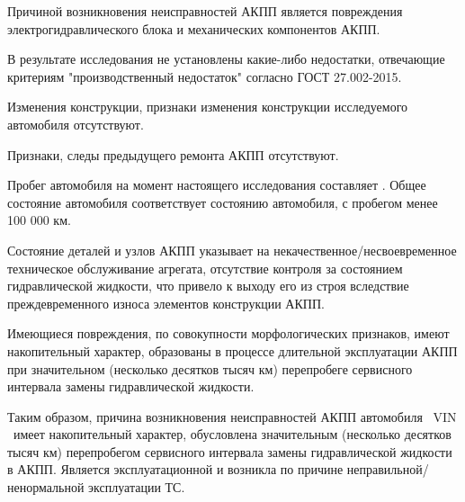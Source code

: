 
Причиной возникновения неисправностей АКПП является  повреждения электрогидравлического блока и механических компонентов АКПП.



В результате исследования не установлены какие-либо недостатки, отвечающие критериям "производственный недостаток" согласно ГОСТ 27.002-2015.

Изменения конструкции, признаки изменения конструкции исследуемого автомобиля отсутствуют.

Признаки, следы предыдущего ремонта АКПП отсутствуют.

Пробег автомобиля на момент настоящего исследования составляет . Общее состояние автомобиля соответствует состоянию автомобиля, с пробегом менее 100 000 км.

Состояние  деталей и узлов АКПП указывает на некачественное/несвоевременное техническое обслуживание агрегата, отсутствие контроля за состоянием гидравлической жидкости, что привело к выходу его из строя вследствие  преждевременного износа элементов конструкции АКПП.

 Имеющиеся повреждения, по совокупности морфологических признаков, имеют накопительный характер, образованы в процессе длительной эксплуатации АКПП при значительном  (несколько десятков тысяч км) перепробеге сервисного интервала замены гидравлической жидкости.
 
 

Таким образом, причина возникновения неисправностей АКПП автомобиля \, VIN \, имеет накопительный характер, обусловлена значительным (несколько десятков тысяч км) перепробегом сервисного интервала замены гидравлической жидкости в АКПП. Является эксплуатационной и возникла по причине неправильной/ненормальной эксплуатации ТС. 



%
%
%





